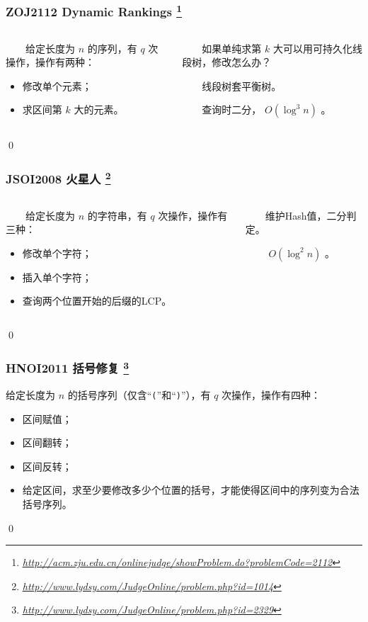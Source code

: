 \documentclass[9pt,dvipsnames,table]{beamer}
\newcommand{\hlink}[1]{
	\footnote{\fontsize{6pt}{\baselineskip}\href{#1}{\textsl{\underline{#1}}}}
}
\newenvironment{qedframe}{%
	\begin{frame}[environment=qedqedframe]%
	}{%
	\qed
	\end{frame}%
}
\begin{document}
\begin{qedframe}
	\frametitle{ZOJ2112 Dynamic Rankings\hlink{http://acm.zju.edu.cn/onlinejudge/showProblem.do?problemCode=2112}}
	\begin{columns}
		\begin{column}{0.5\textwidth}
			　　给定长度为 $ n $ 的序列，有 $ q $ 次操作，操作有两种：
			\begin{itemize}
				\item 修改单个元素；
				\item 求区间第 $ k $ 大的元素。
			\end{itemize}
		\end{column} \pause
		\begin{column}{0.5\textwidth}
			　　如果单纯求第 $ k $ 大可以用可持久化线段树，修改怎么办？\pause
			
			　　线段树套平衡树。
			
			　　查询时二分， $ O(\log^3n) $ 。
		\end{column}
	\end{columns}
\end{qedframe}
\begin{qedframe}
	\frametitle{JSOI2008 火星人\hlink{http://www.lydsy.com/JudgeOnline/problem.php?id=1014}}
	\begin{columns}
		\begin{column}{0.5\textwidth}
			　　给定长度为 $ n $ 的字符串，有 $ q $ 次操作，操作有三种：
			\begin{itemize}
				\item 修改单个字符；
				\item 插入单个字符；
				\item 查询两个位置开始的后缀的LCP。
			\end{itemize}
		\end{column} \pause
		\begin{column}{0.5\textwidth}
			　　维护Hash值，二分判定。
			
			　　 $ O(\log^2n) $ 。
		\end{column}
	\end{columns}
\end{qedframe}
\begin{qedframe}
	\frametitle{HNOI2011 括号修复\hlink{http://www.lydsy.com/JudgeOnline/problem.php?id=2329}}
	给定长度为 $ n $ 的括号序列（仅含``\texttt{(}''和``\texttt{)}''），有 $ q $ 次操作，操作有四种：
	\begin{itemize}
		\item 区间赋值；
		\item 区间翻转；
		\item 区间反转；
		\item 给定区间，求至少要修改多少个位置的括号，才能使得区间中的序列变为合法括号序列。
	\end{itemize}
\end{qedframe}
\end{document}
